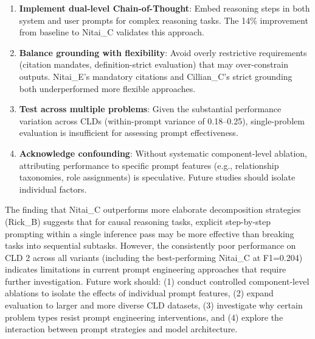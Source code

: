 \begin{enumerate}
    \item \textbf{Implement dual-level Chain-of-Thought}: Embed reasoning steps in both system and user prompts for complex reasoning tasks. The 14\% improvement from baseline to Nitai\_C validates this approach.
    
    \item \textbf{Balance grounding with flexibility}: Avoid overly restrictive requirements (citation mandates, definition-strict evaluation) that may over-constrain outputs. Nitai\_E's mandatory citations and Cillian\_C's strict grounding both underperformed more flexible approaches.
    
    \item \textbf{Test across multiple problems}: Given the substantial performance variation across CLDs (within-prompt variance of 0.18--0.25), single-problem evaluation is insufficient for assessing prompt effectiveness.
    
    \item \textbf{Acknowledge confounding}: Without systematic component-level ablation, attributing performance to specific prompt features (e.g., relationship taxonomies, role assignments) is speculative. Future studies should isolate individual factors.
\end{enumerate}

The finding that Nitai\_C outperforms more elaborate decomposition strategies (Rick\_B) suggests that for causal reasoning tasks, explicit step-by-step prompting within a single inference pass may be more effective than breaking tasks into sequential subtasks. However, the consistently poor performance on CLD 2 across all variants (including the best-performing Nitai\_C at F1=0.204) indicates limitations in current prompt engineering approaches that require further investigation. Future work should: (1) conduct controlled component-level ablations to isolate the effects of individual prompt features, (2) expand evaluation to larger and more diverse CLD datasets, (3) investigate why certain problem types resist prompt engineering interventions, and (4) explore the interaction between prompt strategies and model architecture.
